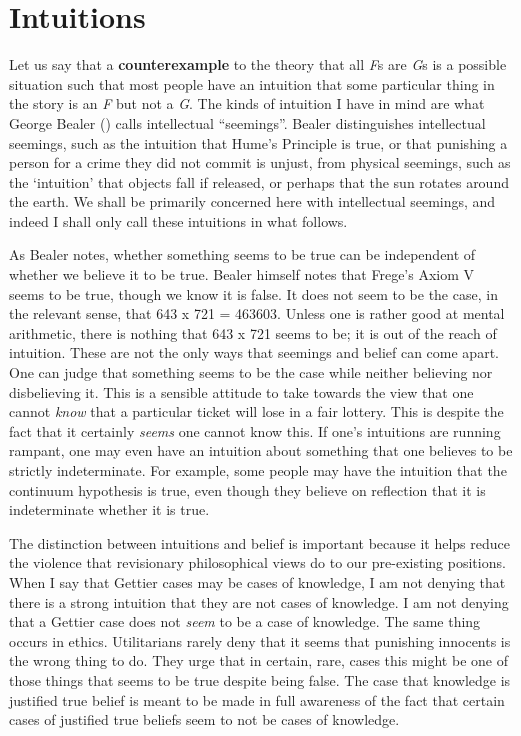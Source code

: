 \documentclass[
  11pt,
  letterpaper,
  DIV=11,
  numbers=noendperiod,
  twoside]{scrartcl}
\begin{document}
\section{Intuitions}\label{intuitions}

Let us say that a \textbf{counterexample} to the theory that all
\emph{F}s are \emph{G}s is a possible situation such that most people
have an intuition that some particular thing in the story is an \emph{F}
but not a \emph{G}. The kinds of intuition I have in mind are what
George Bealer () calls intellectual
``seemings''. Bealer distinguishes intellectual seemings, such as the
intuition that Hume's Principle is true, or that punishing a person for
a crime they did not commit is unjust, from physical seemings, such as
the `intuition' that objects fall if released, or perhaps that the sun
rotates around the earth. We shall be primarily concerned here with
intellectual seemings, and indeed I shall only call these intuitions in
what follows.

As Bealer notes, whether something seems to be true can be independent
of whether we believe it to be true. Bealer himself notes that Frege's
Axiom V seems to be true, though we know it is false. It does not seem
to be the case, in the relevant sense, that 643 x 721 = 463603. Unless
one is rather good at mental arithmetic, there is nothing that 643 x 721
seems to be; it is out of the reach of intuition. These are not the only
ways that seemings and belief can come apart. One can judge that
something seems to be the case while neither believing nor disbelieving
it. This is a sensible attitude to take towards the view that one cannot
\emph{know} that a particular ticket will lose in a fair lottery. This
is despite the fact that it certainly \emph{seems} one cannot know this.
If one's intuitions are running rampant, one may even have an intuition
about something that one believes to be strictly indeterminate. For
example, some people may have the intuition that the continuum
hypothesis is true, even though they believe on reflection that it is
indeterminate whether it is true.

The distinction between intuitions and belief is important because it
helps reduce the violence that revisionary philosophical views do to our
pre-existing positions. When I say that Gettier cases may be cases of
knowledge, I am not denying that there is a strong intuition that they
are not cases of knowledge. I am not denying that a Gettier case does
not \emph{seem} to be a case of knowledge. The same thing occurs in
ethics. Utilitarians rarely deny that it seems that punishing innocents
is the wrong thing to do. They urge that in certain, rare, cases this
might be one of those things that seems to be true despite being false.
The case that knowledge is justified true belief is meant to be made in
full awareness of the fact that certain cases of justified true beliefs
seem to not be cases of knowledge.
\end{document}
